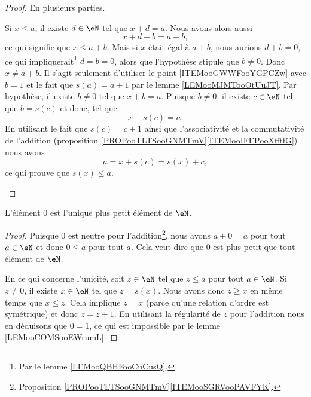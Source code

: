 \begin{proof}
	En plusieurs parties.
	\begin{subproof}
		Si \( x\leq a\), il existe \( d\in \eN\) tel que \( x+d=a\). Nous avons alors aussi
		\begin{equation}
			x+d+b=a+b,
		\end{equation}
		ce qui signifie que \( x\leq a+b\). Mais si \( x\) était égal à \( a+b\), nous aurions \( d+b=0\), ce qui impliquerait\footnote{Par le lemme \ref{LEMooQBHFooCuCusQ}.} \( d=b=0\), alors que l'hypothèse stipule que \( b\neq 0\). Donc \( x\neq a+b\).
		Il s'agit seulement d'utiliser le point \ref{ITEMooGWWFooYGPCZw} avec \( b=1\) et le fait que \( s(a)=a+1\) par le lemme \ref{LEMooMJMTooOtUuJT}.
		Par hypothèse, il existe \( b\neq 0\) tel que \( x+b=a\). Puisque \( b\neq 0\), il existe \( c\in \eN\) tel que \( b=s(c)\) et donc, tel que
		\begin{equation}
			x+s(c)=a.
		\end{equation}
		En utilisant le fait que \( s(c)=c+1\) ainsi que l'associativité et la commutativité de l'addition (proposition \ref{PROPooTLTSooGNMTmV}\ref{ITEMooIFFPooXfftfG}) nous avons
		\begin{equation}
			a=x+s(c)=s(x)+c,
		\end{equation}
		ce qui prouve que \( s(x)\leq a\).
	\end{subproof}
\end{proof}

\begin{lemma}       \label{LEMooCSIXooHeuWEd}
	L'élément \( 0\) est l'unique plus petit élément de \( \eN\).
\end{lemma}

\begin{proof}
	Puisque \( 0\) est neutre pour l'addition\footnote{Proposition \ref{PROPooTLTSooGNMTmV}\ref{ITEMooSGRVooPAVFYK}.}, nous avons \( a+0=a\) pour tout \( a\in \eN\) et donc \( 0\leq a\) pour tout \( a\). Cela veut dire que \( 0\) est plus petit que tout élément de \( \eN\).

	En ce qui concerne l'unicité, soit \( z\in \eN\) tel que \( z\leq a\) pour tout \( a\in \eN\). Si \( z\neq 0\), il existe \( x\in \eN\) tel que \( z=s(x)\). Nous avons donc \( z\geq x\) en même temps que \(x\leq z\). Cela implique \( z=x\) (parce qu'une relation d'ordre est symétrique) et donc \( z=z+1\). En utilisant la régularité de \( z\) pour l'addition nous en déduisons que \( 0=1\), ce qui est impossible par le lemme \ref{LEMooCOMSooEWrumL}.
\end{proof}

